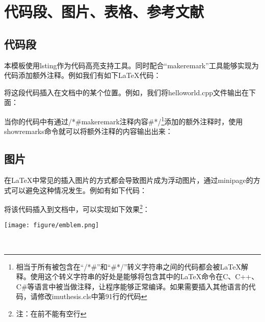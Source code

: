 \chapter{代码段、图片、表格、参考文献}

    \section{代码段}
        本模板使用lsting作为代码高亮支持工具。同时配合“\tbs makeremark”工具能够实现为代码添加额外注释。例如我们有如下\LaTeX 代码：
        \begin{quote}
            
        \end{quote}

        将这段代码插入在文档中的某个位置。例如，我们将helloworld.cpp文件输出在下面：
        
        
        当你的代码中有通过/*\#\tbs makeremark{注释内容}\#*/\footnote{相当于所有被包含在“/*\#”和“\#*/”转义字符串之间的代码都会被\LaTeX 解释。使用这个转义字符串的好处是能够将包含其中的\LaTeX 命令在C、C++、C\#等语言中被当做注释，让程序能够正常编译。如果需要插入其他语言的代码，请修改imuthesis.cls中第91行的代码}添加的额外注释时，使用\tbs showremarks命令就可以将额外注释的内容输出出来：
        \begin{quote}
            \showremarks
        \end{quote}

    \section{图片}
        在\LaTeX 中常见的插入图片的方式都会导致图片成为浮动图片，通过minipage的方式可以避免这种情况发生。例如有如下代码：
        
        
        将该代码插入到文档中，可以实现如下效果\footnote{注：在\tbs{}前不能有空行}：
        \\[\intextsep] 
            \begin{minipage}{\textwidth} 
                \centering
                \texttt{[image: figure/emblem.png]}
                \label{fig:emblem} 
            \end{minipage}
        \\[\intextsep] 

